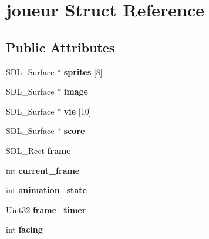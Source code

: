 \hypertarget{structjoueur}{}\section{joueur Struct Reference}
\label{structjoueur}
\subsection*{Public Attributes}
\begin{DoxyCompactItemize}
\item 
\mbox{\label{structjoueur_ae9a49531bc2f35918bbc646718d14f53}} 
S\+D\+L\+\_\+\+Surface $\ast$ {\bfseries sprites} \mbox{[}8\mbox{]}
\item 
\mbox{\label{structjoueur_ac37866aa94ec0ee62d729b627293340e}} 
S\+D\+L\+\_\+\+Surface $\ast$ {\bfseries image}
\item 
\mbox{\label{structjoueur_acb1caaddeb22f11809e05fa2b90c4d4d}} 
S\+D\+L\+\_\+\+Surface $\ast$ {\bfseries vie} \mbox{[}10\mbox{]}
\item 
\mbox{\label{structjoueur_a00972395a785d67166f9997cb75e93aa}} 
S\+D\+L\+\_\+\+Surface $\ast$ {\bfseries score}
\item 
\mbox{\label{structjoueur_a490dc132329c3040775237d6d76c468d}} 
S\+D\+L\+\_\+\+Rect {\bfseries frame}
\item 
\mbox{\label{structjoueur_aa523fc8c3537f0cc97be75ff9fca19e1}} 
int {\bfseries current\+\_\+frame}
\item 
\mbox{\label{structjoueur_a48fdd16e51d3c64b58ffa4b337d4c822}} 
int {\bfseries animation\+\_\+state}
\item 
\mbox{\label{structjoueur_a0a698a48320cbc327a934d242d66d72c}} 
Uint32 {\bfseries frame\+\_\+timer}
\item 
\mbox{\label{structjoueur_aa9133278174ad13c6de1d0675c77adc6}} 
int {\bfseries facing}
\item 
\mbox{\label{structjoueur_a0df959136c568eefc862c620e42098a7}} 

\end{DoxyCompactItemize}
